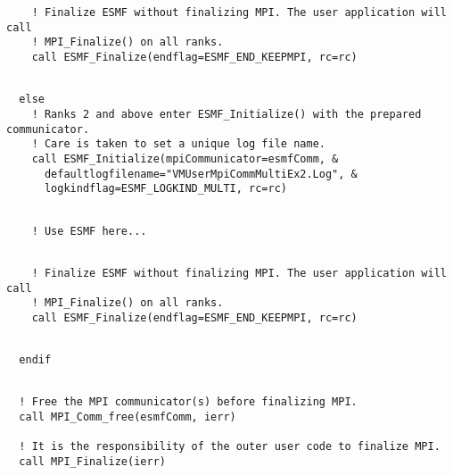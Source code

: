 \begin{verbatim}
    ! Finalize ESMF without finalizing MPI. The user application will call
    ! MPI_Finalize() on all ranks.
    call ESMF_Finalize(endflag=ESMF_END_KEEPMPI, rc=rc)
 
\end{verbatim}
 

 \begin{verbatim}
  else
    ! Ranks 2 and above enter ESMF_Initialize() with the prepared communicator.
    ! Care is taken to set a unique log file name.
    call ESMF_Initialize(mpiCommunicator=esmfComm, &
      defaultlogfilename="VMUserMpiCommMultiEx2.Log", &
      logkindflag=ESMF_LOGKIND_MULTI, rc=rc)
 
\end{verbatim}
 

 \begin{verbatim}
    ! Use ESMF here...
 
\end{verbatim}
 

 \begin{verbatim}
    ! Finalize ESMF without finalizing MPI. The user application will call
    ! MPI_Finalize() on all ranks.
    call ESMF_Finalize(endflag=ESMF_END_KEEPMPI, rc=rc)
 
\end{verbatim}
 

 \begin{verbatim}
  endif
 
\end{verbatim}
 

 \begin{verbatim}
  ! Free the MPI communicator(s) before finalizing MPI.
  call MPI_Comm_free(esmfComm, ierr)
  
  ! It is the responsibility of the outer user code to finalize MPI.
  call MPI_Finalize(ierr)
 
\end{verbatim}

\setlength{\parskip}{\oldparskip}
\setlength{\parindent}{\oldparindent}
\setlength{\baselineskip}{\oldbaselineskip}
